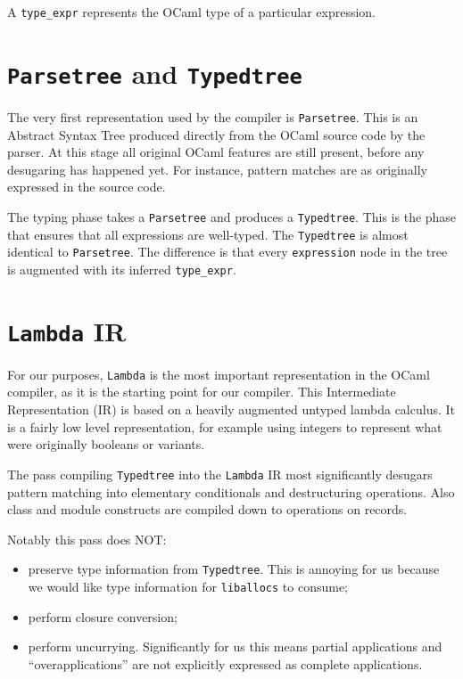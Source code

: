 \documentclass[12pt,a4paper,twoside,openright]{report}
\begin{document}
A \lstinline!type_expr! represents the OCaml type of a particular expression.

\section{\texttt{Parsetree} and \texttt{Typedtree}}

The very first representation used by the compiler is \lstinline!Parsetree!.
This is an Abstract Syntax Tree produced directly from the OCaml source code by
the parser. At this stage all original OCaml features are still present, before
any desugaring has happened yet. For instance, pattern matches are as
originally expressed in the source code.

The typing phase takes a \lstinline!Parsetree! and produces a
\lstinline!Typedtree!. This is the phase that ensures that all expressions are
well-typed. The \lstinline!Typedtree! is almost identical to
\lstinline!Parsetree!. The difference is that every \lstinline!expression! node
in the tree is augmented with its inferred \lstinline!type_expr!.

\section{\texttt{Lambda} IR}

For our purposes, \lstinline!Lambda! is the most important representation in
the OCaml compiler, as it is the starting point for our compiler. This
Intermediate Representation (IR) is based on a heavily augmented untyped lambda calculus.
It is a fairly low level representation, for example using integers to represent
what were originally booleans or variants.

The pass compiling \lstinline!Typedtree! into the \lstinline!Lambda! IR most
significantly desugars pattern matching into elementary conditionals and
destructuring operations. Also class and module constructs are compiled down to
operations on records.

Notably this pass does NOT:
\begin{itemize}
    \item preserve type information from \lstinline!Typedtree!. This is annoying
        for us because we would like type information for
        \lstinline!liballocs! to consume;
    \item perform closure conversion;
    \item perform uncurrying. Significantly for us this means
        partial applications and ``overapplications'' are not explicitly
    expressed as complete applications.
\end{itemize}
\end{document}
